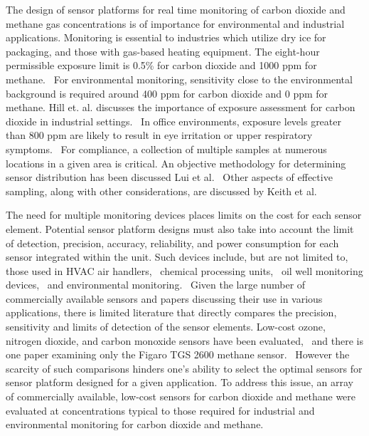 \documentclass[times]{joehreview}
\begin{document}
	The design of sensor platforms for real time monitoring of carbon dioxide and methane gas concentrations is of importance for environmental and industrial applications. Monitoring is essential to industries which utilize dry ice for packaging, and those with gas-based heating equipment.  The eight-hour permissible exposure limit is 0.5\% for carbon dioxide and 1000 ppm for methane.~\cite{centersfordiseasecontrolCentersDiseaseControl2016,centersfordiseasecontrolCentersDiseaseControl2015}  For environmental monitoring, sensitivity close to the environmental background is required around 400 ppm for carbon dioxide and 0 ppm for methane.  Hill et. al. discusses the importance of exposure assessment for carbon dioxide in industrial settings.~\cite{exposure_assessment}  In office environments, exposure levels greater than 800 ppm are likely to result in eye irritation or upper respiratory symptoms.~\cite{sick_building}  For compliance, a collection of multiple samples at numerous locations in a given area is critical.  An objective methodology for determining sensor distribution has been discussed Lui et al.~\cite{airquality_network}  Other aspects of effective sampling, along with other considerations, are discussed by Keith et al.~\cite{keith_principles_1983}
	
	The need for multiple monitoring devices places limits on the cost for each sensor element.  Potential sensor platform designs must also take into account the limit of detection, precision, accuracy, reliability, and power consumption for each sensor integrated within the unit.  Such devices include, but are not limited to, those used in HVAC air handlers,~\cite{yang_systematic_2014,chung_selective_2008} chemical processing units,~\cite{won_nonlinear_2012} oil well monitoring devices,~\cite{yi_remote_2010,somov_deployment_2013} and environmental monitoring.~\cite{pering_high_2014,black_formation_2012,guohua_study_2012,karunanithi_performance_2009,shendell_outdoor_2012}  Given the large number of commercially available sensors and papers discussing their use in various applications, there is limited literature that directly compares the precision, sensitivity and limits of detection of the sensor elements.  Low-cost ozone, nitrogen dioxide, and carbon monoxide sensors have been evaluated,~\cite{low_cost} and there is one paper examining only the Figaro TGS 2600 methane sensor.~\cite{eugster_performance_2012}  However the scarcity of such comparisons hinders one's ability to select the optimal sensors for sensor platform designed for a given application.  To address this issue, an array of commercially available, low-cost sensors for carbon dioxide and methane were evaluated at concentrations typical to those required for industrial and environmental monitoring for carbon dioxide and methane.
	
\end{document}
